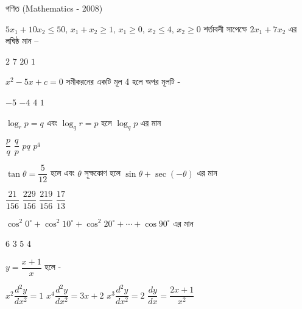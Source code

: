 \documentclass[addpoints]{exam}
\begin{document}
\begin{LARGE}
\begin{center}
গণিত (Mathematics - 2008)
\end{center}
\end{LARGE}
\begin{questions}

\question  $ 5x_{1}+10x_{2}\le 50,\, x_{1}+x_{2}\ge 1,\, x_{1}\ge 0,\,x_{2}\le 4,\, x_{2}\ge 0 $ শর্তাবলী সাপেক্ষে $ 2x_{1}+7x_{2} $ এর লঘিষ্ঠ মান – 

\begin{oneparchoices}
\choice $ 2 $
\choice $ 7 $
\choice $ 20 $
\choice $ 1 $
\end{oneparchoices}

\question $ x^{2}-5x+c=0 $ সমীকরনের একটি মূল 4 হলে অপর মূলটি -

\begin{oneparchoices}
\choice $ -5 $
\choice $ -4 $
\choice $ 4 $
\choice $ 1 $
\end{oneparchoices}

\question $ \log_{r}p =q $ এবং $ \log_{q}r = p$ হলে $ \log_{q}p $ এর মান

\begin{oneparchoices}
\choice $ \dfrac{p}{q} $
\choice $ \dfrac{q}{p} $
\choice $ pq $
\choice  $ p^{q} $
\end{oneparchoices}

\question $ \tan\theta = \dfrac{5}{12} $ হলে এবং $ \theta $ সূক্ষকোণ হলে $ \sin\theta + \sec (-\theta) $ এর মান

\begin{oneparchoices}
\choice $  \dfrac{21}{156} $
\choice $  \dfrac{229}{156} $
\choice $ \dfrac{219}{156} $
\choice  $ \dfrac{17}{13} $
\end{oneparchoices}

\question $ \cos^{2} 0^{\circ} +\cos^{2} 10^{\circ} + \cos^{2} 20^{\circ} +\cdots + \cos 90^{\circ}$ এর মান

\begin{oneparchoices}
\choice $ 6 $
\choice $ 3 $
\choice $ 5 $
\choice $ 4 $
\end{oneparchoices}

\question $ y=\dfrac{x+1}{x}  $ হলে - 

\begin{oneparchoices}
\choice $ x^{2}\dfrac{d^{2}y}{dx^{2}} =1 $
\choice $ x^{4}\dfrac{d^{2}y}{dx^{2}} =3x+2 $
\choice $ x^{3}\dfrac{d^{2}y}{dx^{2}} =2 $
\choice $ \dfrac{dy}{dx} = \dfrac{2x+1}{x^{2}}$
\end{oneparchoices}


\end{questions}
\end{document}
